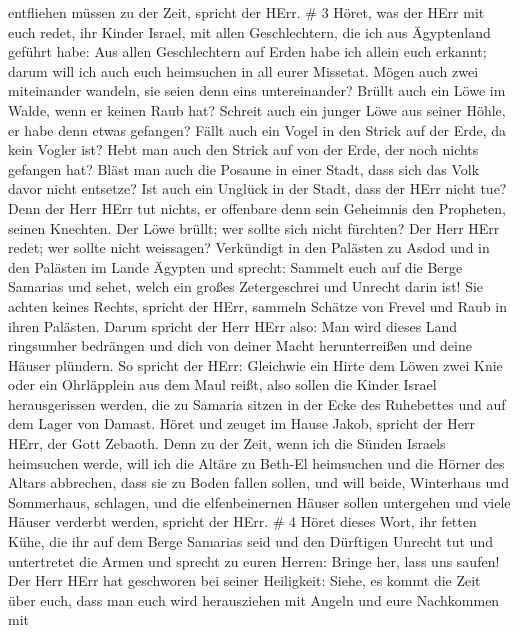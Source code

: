 entfliehen müssen zu der Zeit, spricht der HErr. \# 3 
Höret, was der HErr mit euch redet, ihr Kinder Israel, mit allen
Geschlechtern, die ich aus Ägyptenland geführt habe:  Aus
allen Geschlechtern auf Erden habe ich allein euch erkannt; darum will
ich auch euch heimsuchen in all eurer Missetat.  Mögen auch
zwei miteinander wandeln, sie seien denn eins untereinander?
 Brüllt auch ein Löwe im Walde, wenn er keinen Raub hat?
Schreit auch ein junger Löwe aus seiner Höhle, er habe denn etwas
gefangen?  Fällt auch ein Vogel in den Strick auf der Erde,
da kein Vogler ist? Hebt man auch den Strick auf von der Erde, der noch
nichts gefangen hat?  Bläst man auch die Posaune in einer
Stadt, dass sich das Volk davor nicht entsetze? Ist auch ein Unglück in
der Stadt, dass der HErr nicht tue?  Denn der Herr HErr tut
nichts, er offenbare denn sein Geheimnis den Propheten, seinen Knechten.
 Der Löwe brüllt; wer sollte sich nicht fürchten? Der Herr
HErr redet; wer sollte nicht weissagen?  Verkündigt in den
Palästen zu Asdod und in den Palästen im Lande Ägypten und sprecht:
Sammelt euch auf die Berge Samarias und sehet, welch ein großes
Zetergeschrei und Unrecht darin ist!  Sie achten keines
Rechts, spricht der HErr, sammeln Schätze von Frevel und Raub in ihren
Palästen.  Darum spricht der Herr HErr also: Man wird
dieses Land ringsumher bedrängen und dich von deiner Macht
herunterreißen und deine Häuser plündern.  So spricht der
HErr: Gleichwie ein Hirte dem Löwen zwei Knie oder ein Ohrläpplein aus
dem Maul reißt, also sollen die Kinder Israel herausgerissen werden, die
zu Samaria sitzen in der Ecke des Ruhebettes und auf dem Lager von
Damast.  Höret und zeuget im Hause Jakob, spricht der Herr
HErr, der Gott Zebaoth.  Denn zu der Zeit, wenn ich die
Sünden Israels heimsuchen werde, will ich die Altäre zu Beth-El
heimsuchen und die Hörner des Altars abbrechen, dass sie zu Boden fallen
sollen,  und will beide, Winterhaus und Sommerhaus,
schlagen, und die elfenbeinernen Häuser sollen untergehen und viele
Häuser verderbt werden, spricht der HErr. \# 4  Höret dieses
Wort, ihr fetten Kühe, die ihr auf dem Berge Samarias seid und den
Dürftigen Unrecht tut und untertretet die Armen und sprecht zu euren
Herren: Bringe her, lass uns saufen!  Der Herr HErr hat
geschworen bei seiner Heiligkeit: Siehe, es kommt die Zeit über euch,
dass man euch wird herausziehen mit Angeln und eure Nachkommen mit
